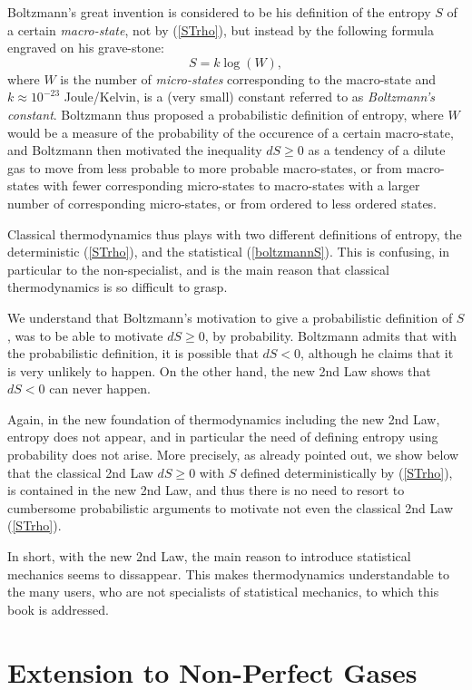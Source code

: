 Boltzmann's  great invention is considered to be his
definition of the entropy $S$ of a certain \emph{macro-state}, not
by (\ref{STrho}), but instead by the following formula engraved
on his grave-stone:
\begin{equation}\label{boltzmannS}
S=k\log(W),
\end{equation}
where $W$ is the number of \emph{micro-states} corresponding
to the macro-state and $k\approx 10^{-23}$ Joule/Kelvin, is a (very small) constant referred to as
\emph{Boltzmann's constant}. Boltzmann thus proposed a probabilistic
definition of entropy, where $W$ 
would be a measure of the probability of the occurence of a certain 
macro-state, and Boltzmann then motivated the inequality $dS\ge 0$ as
a tendency of a dilute gas to move from less probable to more probable
macro-states, or from macro-states with fewer corresponding 
micro-states to macro-states with a larger number of
corresponding micro-states, or from ordered to less ordered states.

Classical thermodynamics thus plays with two different definitions
of entropy, the deterministic (\ref{STrho}), and the statistical
(\ref{boltzmannS}). This is confusing, in particular to the
non-specialist, and is the main reason that classical thermodynamics 
is so difficult to grasp. 

We understand that Boltzmann's motivation to give a probabilistic
definition of $S$, was to be able to motivate $dS\ge 0$, by probability.
Boltzmann admits that with the probabilistic definition, it is
possible that $dS<0$, although he claims that it is very unlikely to happen.
On the other hand, the new 2nd Law shows that 
$dS<0$ can never happen.

Again, in the new foundation of thermodynamics including the new 2nd Law, 
entropy does not appear, and in particular the need of defining entropy 
using probability does not arise. More precisely, as already pointed out, we 
show below that the classical 2nd Law $dS\ge 0$ with $S$ defined 
deterministically by (\ref{STrho}), is contained in the new 2nd Law,
and thus there is no need to resort to cumbersome 
probabilistic arguments to motivate not even the classical 2nd Law
(\ref{STrho}).

In short, with the new 2nd Law, the main reason to introduce statistical
mechanics seems to dissappear. This makes thermodynamics understandable
to the many users, who are not specialists of statistical mechanics,
to which this book is addressed. 

\section{Extension to Non-Perfect Gases}

